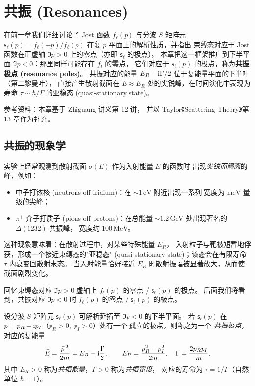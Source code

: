 \chapter{共振 (Resonances)}\label{ch:resonance}

在前一章我们详细讨论了 Jost 函数 $f_\ell(p)$ 与分波 $S$ 矩阵元
$\mathsf{s}_\ell(p)=f_\ell(-p)/f_\ell(p)$ 在复 $p$ 平面上的解析性质，并指出
束缚态对应于 Jost 函数在正虚轴 $\Im p>0$ 上的零点（亦即 $\mathsf{s}_\ell$ 的极点）。
本章把这一框架推广到下半平面 $\Im p<0$：那里同样可能存在 $f_\ell$ 的零点，
它们对应于 $\mathsf{s}_\ell(p)$ 的极点，称为\textbf{共振极点 (resonance poles)}。
共振对应的能量 $E_R-\mathrm{i}\Gamma/2$ 位于复能量平面的下半叶（第二黎曼叶），
直接产生散射截面在 $E\approx E_R$ 处的尖锐峰，在时间演化中表现为
寿命 $\tau\sim\hbar/\Gamma$ 的亚稳态 (quasi-stationary state)。

参考资料：本章基于 Zhiguang 讲义第 12 讲，
并以 Taylor《Scattering Theory》第 13 章作为补充。

\section{共振的现象学}

实验上经常观测到散射截面 $\sigma(E)$ 作为入射能量 $E$ 的函数时
出现\emph{尖锐而隔离}的峰，例如：
\begin{itemize}
  \item 中子打铱核 (neutrons off iridium)：在 $\sim 1\,\mathrm{eV}$ 附近出现一系列
    宽度为 $\mathrm{meV}$ 量级的尖峰；
  \item $\pi^+$ 介子打质子 (pions off protons)：在总能量
    $\sim 1.2\,\mathrm{GeV}$ 处出现著名的 $\Delta(1232)$ 共振峰，
    宽度约 $100\,\mathrm{MeV}$。
\end{itemize}
这种现象意味着：在散射过程中，对某些特殊能量 $E_R$，
入射粒子与靶被短暂地俘获，形成一个接近束缚态的"亚稳态"
(quasi-stationary state)；该态会在有限寿命 $\tau$ 内衰变回散射末态。
当入射能量恰好接近 $E_R$ 时散射振幅被显著放大，从而使截面剧烈变化。

回忆束缚态对应 $\Im p>0$ 虚轴上 $f_\ell(p)$ 的零点 / $\mathsf{s}_\ell(p)$ 的极点。
后面我们将看到，共振对应 $\Im p<0$ 时 $f_\ell(p)$ 的零点 /
$\mathsf{s}_\ell(p)$ 的极点。

\begin{definition}[共振极点]\label{def:res-pole}
  设分波 $S$ 矩阵元 $\mathsf{s}_\ell(p)$ 可解析延拓至 $\Im p<0$ 的下半平面。
  若 $\mathsf{s}_\ell(p)$ 在 $\bar p=p_R-\mathrm{i} p_I$（$p_R>0,\;p_I>0$）处有一个
  孤立的极点，则称之为一个 \emph{共振极点}，对应的复能量
  \begin{equation}
    \bar E=\frac{\bar p^{\,2}}{2m}=E_R-\mathrm{i}\frac{\Gamma}{2},\qquad
    E_R=\frac{p_R^2-p_I^2}{2m},\quad \Gamma=\frac{2 p_R p_I}{m},
  \end{equation}
  其中 $E_R>0$ 称为\emph{共振能量}，$\Gamma>0$ 称为\emph{共振宽度}，
  对应的寿命为 $\tau=1/\Gamma$（自然单位 $\hbar=1$）。
\end{definition}

